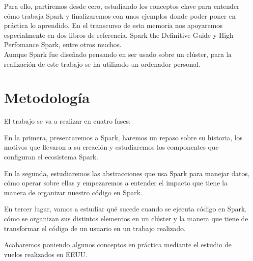 Para ello,  partiremos desde cero, estudiando los conceptos clave para entender cómo trabaja Spark y finalizaremos con unos ejemplos donde poder poner en práctica lo aprendido. En el transcurso de esta memoria nos apoyaremos  especialmente en dos libros de referencia, Spark the Definitive Guide \cite{stdg} y High Perfomance Spark\cite{HPerfomance}, entre otros muchos.\\

Aunque Spark fue diseñado pensando en ser usado sobre un clúster, para la realización de este trabajo se ha utilizado un ordenador personal.\\


\section{Metodología}

El trabajo se va a realizar en cuatro fases:

En la primera, presentaremos a Spark, haremos un repaso sobre su historia, los motivos que llevaron a su creación  y estudiaremos los componentes que configuran el ecosistema Spark.

En la segunda, estudiaremos las abstracciones que usa Spark para manejar datos, cómo operar sobre ellas y empezaremos a entender el impacto que tiene la manera de organizar nuestro código en Spark.

En tercer lugar, vamos a estudiar qué sucede cuando se ejecuta código en Spark, cómo se organizan sus distintos elementos en un clúster y la manera que tiene de transformar el código de un usuario en un trabajo realizado.

Acabaremos poniendo algunos conceptos en práctica mediante el estudio de vuelos realizados en EEUU.
